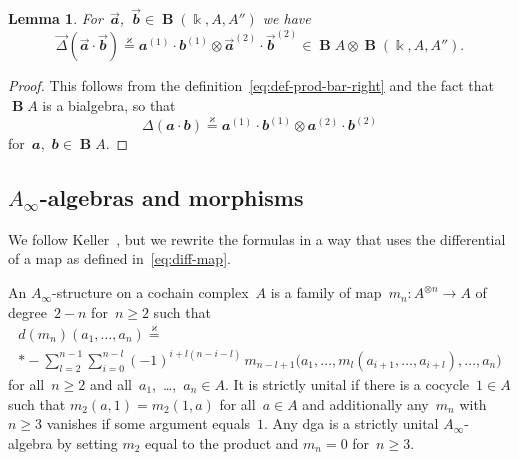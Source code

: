 \documentclass[letterpaper]{amsart}
\numberwithin{equation}{section}
\theoremstyle{plain}
\newtheorem{lemma}[theorem]{Lemma}
\theoremstyle{definition}
\theoremstyle{remark}
\def\Ainf{A_{\infty}}
\DeclareMathOperator{\BB}{\mathbf{B}}
\def\kk{\Bbbk}
\def\aa{\mathbfit{a}}
\def\raa{\overset{\text{$\rightarrow$}}{\aa}}
\def\bb{\mathbfit{b}}
\def\rbb{\overset{\text{$\rightarrow$}}{\bb}}
\def\rDelta{\overset{\text{$\rightarrow$}}{\Delta}}
\def\swee#1#2{#1^{(#2)}}
\let\KS\varkappa
\def\eqKS{\stackrel{\KS}{=}}
\begin{document}
\begin{lemma}
  \label{thm:diag-rb}
  For~$\raa$,~$\rbb\in \BB(\kk,A,A'')$ we have
  \begin{equation*}
    \rDelta(\raa\cdot\rbb) \eqKS \swee{\aa}{1}\cdot\swee{\bb}{1} \otimes \swee{\raa}{2}\cdot\swee{\rbb}{2} \in \BB A\otimes \BB(\kk,A,A'').
  \end{equation*}
\end{lemma}

\begin{proof}
  This follows from the definition~\eqref{eq:def-prod-bar-right} and the fact that $\BB A$ is a bialgebra, so that
  \begin{equation}
    \Delta(\aa\cdot\bb) \eqKS \swee{\aa}{1}\cdot\swee{\bb}{1} \otimes \swee{\aa}{2}\cdot\swee{\bb}{2}
  \end{equation}
  for~$\aa$,~$\bb\in \BB A$.
\end{proof}


\subsection{\texorpdfstring{$\Ainf$}{A∞}-algebras and morphisms}
\label{sec:ainf}

We follow Keller~\cite[Sec.~3]{Keller:2001}, but we rewrite the formulas in a way
that uses the differential of a map as defined in~\eqref{eq:diff-map}.

An $\Ainf$-structure on a cochain complex~$A$ is a family of map~$m_{n}\colon A^{\otimes n}\to A$
of degree~$2-n$ for~$n\ge2$ such that
\begin{multline}
  \label{eq:def-ainf-mul}
  d(m_{n})(a_{1},\dots,a_{n}) \eqKS \\*
  - \sum_{l=2}^{n-1}\sum_{i=0}^{n-l} (-1)^{i+l(n-i-l)}\,m_{n-l+1}\bigl(a_{1},\dots,m_{l}(a_{i+1},\dots,a_{i+l}),\dots,a_{n}\bigr)
\end{multline}
for all~$n\ge2$ and all~$a_{1}$,~\dots,~$a_{n}\in A$.
It is strictly unital if there is a cocycle~$1\in A$ such that $m_{2}(a,1)=m_{2}(1,a)$ for all~$a\in A$
and additionally any~$m_{n}$ with~$n\ge3$ vanishes if some argument equals~$1$.
Any dga is a strictly unital $\Ainf$-algebra by setting $m_{2}$ equal to the product and $m_{n}=0$ for~$n\ge3$.
\end{document}
